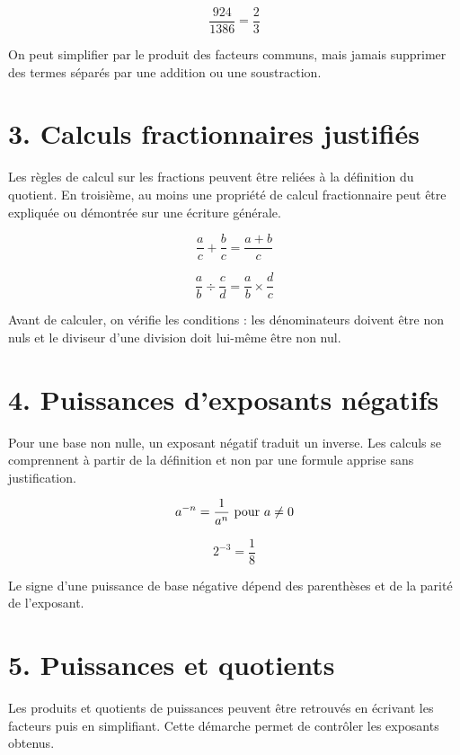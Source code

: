 \[
\dfrac{924}{1386}=\dfrac23
\]

\begin{exemple}
On peut simplifier par le produit des facteurs communs, mais jamais supprimer des termes séparés par une addition ou une soustraction.
\end{exemple}


\section{3. Calculs fractionnaires justifiés}
Les règles de calcul sur les fractions peuvent être reliées à la définition du quotient. En troisième, au moins une propriété de calcul fractionnaire peut être expliquée ou démontrée sur une écriture générale.

\[
\dfrac ac+\dfrac bc=\dfrac{a+b}{c}
\]

\[
\dfrac ab\div\dfrac cd=\dfrac ab\times\dfrac dc
\]

\begin{exemple}
Avant de calculer, on vérifie les conditions : les dénominateurs doivent être non nuls et le diviseur d’une division doit lui-même être non nul.
\end{exemple}

\section{4. Puissances d’exposants négatifs}
Pour une base non nulle, un exposant négatif traduit un inverse. Les calculs se comprennent à partir de la définition et non par une formule apprise sans justification.

\[
a^{-n}=\dfrac1{a^n}$ pour $a\neq0
\]

\[
2^{-3}=\dfrac18
\]

\begin{exemple}
Le signe d’une puissance de base négative dépend des parenthèses et de la parité de l’exposant.
\end{exemple}

\section{5. Puissances et quotients}
Les produits et quotients de puissances peuvent être retrouvés en écrivant les facteurs puis en simplifiant. Cette démarche permet de contrôler les exposants obtenus.

